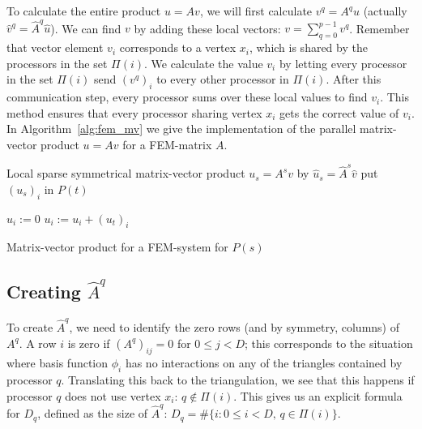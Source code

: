 \documentclass[11pt]{amsart}
\theoremstyle{definition}
\begin{document}
To calculate the entire product $u = Av$, we will first calculate $v^q = A^q u$ (actually $\hat v^q = \hat A^q \hat u$). We can find $v$ by adding these local vectors: $v = \sum_{q =0}^{p-1} v^q$. Remember that vector element $v_i$ corresponds to a vertex $x_i$, which is shared by the processors in the set $\Pi(i)$. We calculate the value $v_i$ by letting every processor in the set $\Pi(i)$ send $(v^q)_i$ to every other processor in $\Pi(i)$. After this communication step, every processor sums over these local values to find $v_i$. This method ensures that every processor sharing vertex $x_i$ gets the correct value of $v_i$. In Algorithm~\ref{alg:fem_mv} we give the implementation of the parallel matrix-vector product $u = Av$ for a FEM-matrix $A$.

\begin{algorithm}[H]
	Local sparse symmetrical matrix-vector product $u_s = A^s v$ by $\hat u_s = \hat A^s \hat v$\;
	 {
		 {
			put $(u_s)_i$ in $P(t)$\;
		}
	}
  
	 {
		$u_i := 0$\;
		 {
			$u_i := u_i + (u_t)_i$\;
		}
	}
 \caption{Matrix-vector product for a FEM-system for $P(s)$}
 \label{alg:fem_mv}
\end{algorithm}

\subsection{Creating $\hat A^q$}
To create $\hat A^q$, we need to identify the zero rows (and by symmetry, columns) of $A^q$. A row $i$ is zero if $(A^q)_{ij} = 0$ for $0 \leq j < D$; this corresponds to the situation where basis function $\phi_i$ has no interactions on any of the triangles contained by processor $q$.  Translating this back to the triangulation, we see that this happens if processor $q$ does not use vertex $x_i$: $q \not \in \Pi(i)$. This gives us an explicit formula for $D_q$, defined as the size of $\hat A^q$: $D_q = \#\{ i : 0 \leq i < D,\, q \in \Pi(i)\}$.
\end{document}
